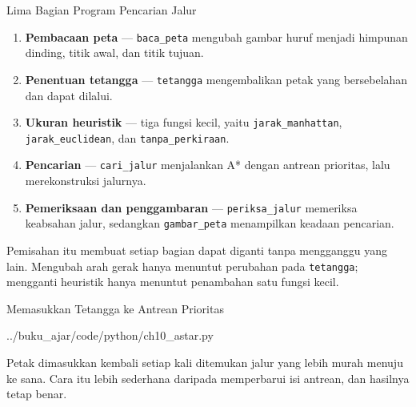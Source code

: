 \documentclass[aspectratio=169,10pt]{beamer}
\begin{document}
\begin{frame}{Lima Bagian Program Pencarian Jalur}
\begin{enumerate}
  \item \textbf{Pembacaan peta} --- \texttt{baca\_peta} mengubah gambar huruf
        menjadi himpunan dinding, titik awal, dan titik tujuan.
  \item \textbf{Penentuan tetangga} --- \texttt{tetangga} mengembalikan petak
        yang bersebelahan dan dapat dilalui.
  \item \textbf{Ukuran heuristik} --- tiga fungsi kecil, yaitu
        \texttt{jarak\_manhattan}, \texttt{jarak\_euclidean}, dan
        \texttt{tanpa\_perkiraan}.
  \item \textbf{Pencarian} --- \texttt{cari\_jalur} menjalankan A* dengan
        antrean prioritas, lalu merekonstruksi jalurnya.
  \item \textbf{Pemeriksaan dan penggambaran} --- \texttt{periksa\_jalur}
        memeriksa keabsahan jalur, sedangkan \texttt{gambar\_peta} menampilkan
        keadaan pencarian.
\end{enumerate}
\vspace{0.12cm}
\begin{kotak}
Pemisahan itu membuat setiap bagian dapat diganti tanpa mengganggu yang lain.
Mengubah arah gerak hanya menuntut perubahan pada \texttt{tetangga}; mengganti
heuristik hanya menuntut penambahan satu fungsi kecil.
\end{kotak}
\end{frame}

\begin{frame}[fragile]{Memasukkan Tetangga ke Antrean Prioritas}

  {../buku_ajar/code/python/ch10_astar.py}
\vspace{0.08cm}
\begin{kotak}
Petak dimasukkan kembali setiap kali ditemukan jalur yang lebih murah menuju
ke sana. Cara itu lebih sederhana daripada memperbarui isi antrean, dan
hasilnya tetap benar.
\end{kotak}
\end{frame}
\end{document}
